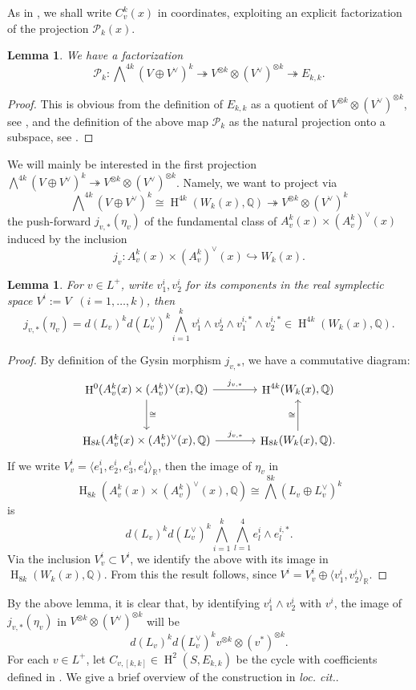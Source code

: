 \documentclass[12pt,a4paper,reqno]{amsart}
\theoremstyle{definition}
\numberwithin{definition}{subsection}
\theoremstyle{definition}
\numberwithin{Definition}{subsection}
\theoremstyle{remark}
\theoremstyle{remark}
\numberwithin{Remark}{subsection}
\theoremstyle{remark}
\theoremstyle{plain}
\numberwithin{Theorem}{subsection}
\theoremstyle{plain}
\theoremstyle{plain}
\theoremstyle{plain}
\theoremstyle{plain}
\newtheorem{Lemma}[Theorem]{Lemma}
\theoremstyle{plain}
\theoremstyle{plain}
\theoremstyle{plain}
\newcommand*{\Q}{\mathbb{Q}}
\newcommand*{\R}{\mathbb{R}}
\DeclareMathOperator{\h}{H}
\begin{document}
As in \cite[p. 23]{gordon}, we shall write $C_v^k(x)$ in coordinates, exploiting an explicit factorization of the projection $\mathcal{P}_k(x)$.
\begin{Lemma}
We have a factorization
\[
\mathcal{P}_k:\bigwedge\nolimits^{4k}(V\oplus V^\vee)^k\twoheadrightarrow V^{\otimes k}\otimes (V^\vee)^{\otimes k}\twoheadrightarrow E_{k,k}.
\]
\end{Lemma}
\begin{proof}
This is obvious from the definition of $E_{k,k}$ as a quotient of $V^{\otimes k}\otimes (V^\vee)^{\otimes k}$, see \cite[p. 40]{little}, and the definition of the above map $\mathcal{P}_k$ as the natural projection onto a subspace, see \cite[p. 267]{gordon1}.
\end{proof}
We will mainly be interested in the first projection
$\bigwedge\nolimits^{4k}(V\oplus V^\vee)^k\twoheadrightarrow V^{\otimes k}\otimes (V^\vee)^{\otimes k}$. Namely, we want to project via $$\bigwedge\nolimits^{4k}(V\oplus V^\vee)^k\cong \h^{4k}(W_k(x),\Q)\twoheadrightarrow V^{\otimes k}\otimes (V^\vee)^{k}$$ the push-forward $j_{v,*}(\eta_v)$ of the fundamental class of $A_v^k(x)\times (A_v^k)^\vee(x)$ induced by the inclusion
\[
j_v:A_v^k(x)\times (A_v^k)^\vee(x)\hookrightarrow W_k(x).
\]
\begin{Lemma} For $v\in L^+$, write $v_1^i,v_2^i$ for its components in the real symplectic space $V^i:=V\;\; (i=1,\dots, k)$, then
\[
j_{v,*}(\eta_v)=d(L_v)^{k}d(L_v^\vee)^{k}\bigwedge_{i=1}^{k}v^i_1\wedge v_2^i\wedge v_1^{i,*}\wedge v_2^{i,*}\in \h^{4k}(W_k(x),\Q).
\]
\end{Lemma}

\begin{proof}
By definition of the Gysin morphism $j_{v,*}$, we have a commutative diagram:
\[
\begin{tikzcd}[row sep=large, column sep=large]
\h^0(A_v^k(x)\times (A_v^k)^\vee(x),\Q) \arrow[d, "\cong"] \arrow[r,"j_{v,*}"]    &   \h^{4k}(W_k(x),\Q)  \\
\h_{8k}(A_v^k(x)\times (A_v^k)^\vee(x),\Q) \arrow[r,"j_{v,*}"] & \h_{8k}(W_k(x),\Q) \arrow[u, "\cong"].
\end{tikzcd}
\]
If we write $V_v^i=\langle e_1^i,e_2^i,e_3^i,e_4^i\rangle_\R$, then the image of $\eta_v$ in $$\h_{8k}(A_v^k(x)\times (A_v^k)^\vee(x),\Q)\cong \bigwedge^{8k} (L_v\oplus L_v^\vee)^k$$ is
\[
d(L_v)^{k}d(L_v^\vee)^{k}\bigwedge_{i=1}^{k}\bigwedge_{l=1}^{4}e^i_l\wedge e_l^{i,*}.
\]
Via the inclusion $V_v^i\subset V^i$, we identify the above with its image in $\h_{8k}(W_k(x),\Q)$. From this the result follows, since $V^i=V^i_v\oplus \langle v_1^i,v_2^i\rangle_\R$.
\end{proof}
By the above lemma, it is clear that, by identifying $v_1^i\wedge v_2^i$ with $v^i$, the image of $j_{v,*}(\eta_v)$ in $ V^{\otimes k}\otimes (V^\vee)^{\otimes k}$ will be
\[
d(L_v)^{k}d(L_v^\vee)^{k}v^{\otimes k}\otimes (v^*)^{\otimes k}.
\]
For each $v\in L^+$, let $C_{v,[k,k]}\in \h^2(S,E_{k,k})$ be the cycle with coefficients defined in \cite[p. 51]{little}. We give a brief overview of the construction in \textit{loc. cit.}.
\end{document}
